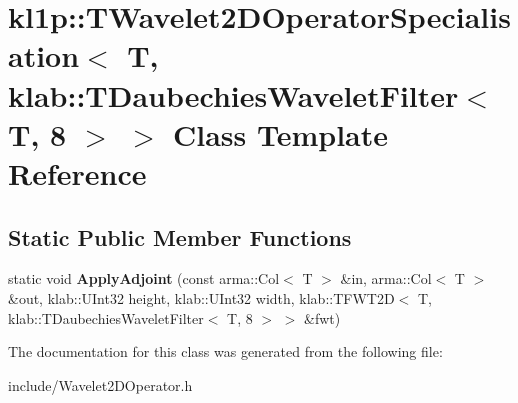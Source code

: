 \hypertarget{classkl1p_1_1TWavelet2DOperatorSpecialisation_3_01T_00_01klab_1_1TDaubechiesWaveletFilter_3_01T_00_018_01_4_01_4}{}\section{kl1p\+:\+:T\+Wavelet2\+D\+Operator\+Specialisation$<$ T, klab\+:\+:T\+Daubechies\+Wavelet\+Filter$<$ T, 8 $>$ $>$ Class Template Reference}
\label{classkl1p_1_1TWavelet2DOperatorSpecialisation_3_01T_00_01klab_1_1TDaubechiesWaveletFilter_3_01T_00_018_01_4_01_4}
\subsection*{Static Public Member Functions}
\begin{DoxyCompactItemize}
\item 
static void {\bfseries Apply\+Adjoint} (const arma\+::\+Col$<$ T $>$ \&in, arma\+::\+Col$<$ T $>$ \&out, klab\+::\+U\+Int32 height, klab\+::\+U\+Int32 width, klab\+::\+T\+F\+W\+T2D$<$ T, klab\+::\+T\+Daubechies\+Wavelet\+Filter$<$ T, 8 $>$ $>$ \&fwt)\hypertarget{classkl1p_1_1TWavelet2DOperatorSpecialisation_3_01T_00_01klab_1_1TDaubechiesWaveletFilter_3_01T_00_018_01_4_01_4_a208960587415b68320fb0bd20b42ab21}{}\label{classkl1p_1_1TWavelet2DOperatorSpecialisation_3_01T_00_01klab_1_1TDaubechiesWaveletFilter_3_01T_00_018_01_4_01_4_a208960587415b68320fb0bd20b42ab21}

\end{DoxyCompactItemize}


The documentation for this class was generated from the following file\+:\begin{DoxyCompactItemize}
\item 
include/Wavelet2\+D\+Operator.\+h\end{DoxyCompactItemize}
